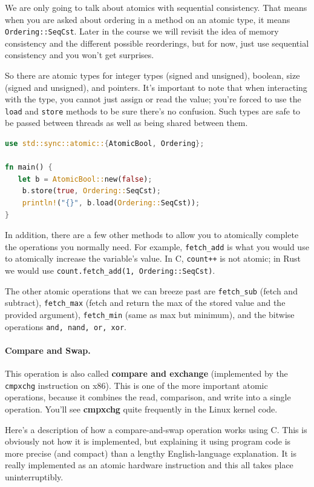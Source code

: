 \documentclass[a4paper]{report}
\begin{document}
We are only going to talk about atomics with sequential consistency. That means when you are asked about ordering in a method on an atomic type, it means \texttt{Ordering::SeqCst}. Later in the course we will revisit the idea of memory consistency and the different possible reorderings, but for now, just use sequential consistency and you won't get surprises.

So there are atomic types for integer types (signed and unsigned), boolean, size (signed and unsigned), and pointers. It's important to note that when interacting with the type, you cannot just assign or read the value; you're forced to use the \texttt{load} and \texttt{store} methods to be sure there's no confusion. Such types are safe to be passed between threads as well as being shared between them. 

\begin{lstlisting}[language=Rust]
use std::sync::atomic::{AtomicBool, Ordering};

fn main() {
   let b = AtomicBool::new(false);
    b.store(true, Ordering::SeqCst);
    println!("{}", b.load(Ordering::SeqCst));
}
\end{lstlisting}

In addition, there are a few other methods to allow you to atomically complete the operations you normally need. For example, \texttt{fetch\_add} is what you would use to atomically increase the variable's value. In C, \texttt{count++} is not atomic; in Rust we would use \texttt{count.fetch\_add(1, Ordering::SeqCst)}.

The other atomic operations that we can breeze past are \texttt{fetch\_sub} (fetch and subtract), \texttt{fetch\_max} (fetch and return the max of the stored value and the provided argument), \texttt{fetch\_min} (same as max but minimum), and the bitwise operations \texttt{and, nand, or, xor}.


\paragraph{Compare and Swap.} This operation is also called {\bf compare and exchange} (implemented by the {\tt cmpxchg} instruction on x86). This is one of the more important atomic operations, because it combines the read, comparison, and write into a single operation. You'll see {\bf cmpxchg} quite frequently in the Linux kernel code.

Here's a description of how a compare-and-swap operation works using C. This is obviously not how it is implemented, but explaining it using program code is more precise (and compact) than a lengthy English-language explanation. It is really implemented as an atomic hardware instruction and this all takes place uninterruptibly. 
\end{document}
